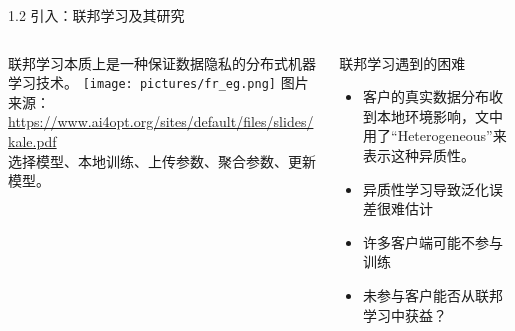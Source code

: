 \documentclass{beamer}
\begin{document}
\begin{frame}{1.2 引入：联邦学习及其研究}
\begin{columns}[T] %
    \begin{column}{.5\textwidth}
        联邦学习本质上是一种保证数据隐私的分布式机器学习技术。
    \texttt{[image: pictures/fr\_eg.png]}
    {\tiny{图片来源：\url{https://www.ai4opt.org/sites/default/files/slides/kale.pdf}}}\\
    选择模型、本地训练、上传参数、聚合参数、更新模型。
    \end{column}%
    \begin{column}{.5\textwidth}
    \pause
    \begin{block}{联邦学习遇到的困难}
        \begin{itemize}
            \item 客户的真实数据分布收到本地环境影响{\color{red}{(Non-IID)}}，文中用了“Heterogeneous”来表示这种异质性。
            \pause
            \item 异质性学习导致泛化误差很难估计
            \pause
            \item 许多客户端可能不参与训练{\color{red}{(Unparticipating Clients)}}
            \pause
            \item 未参与客户能否从联邦学习中获益？
        \end{itemize}
    \end{block}
    \end{column}%
    \end{columns}
\end{frame}
\end{document}
